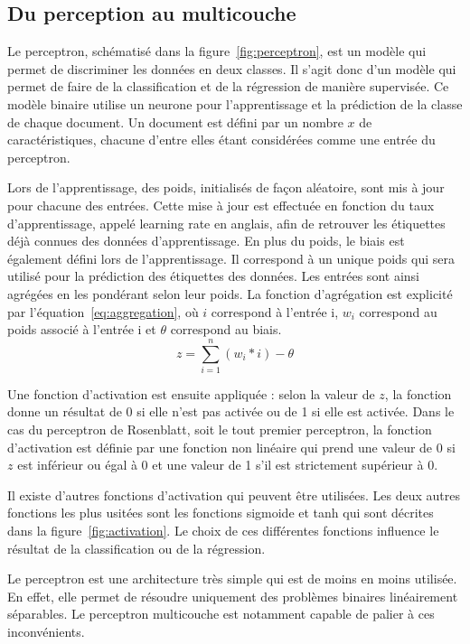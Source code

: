 \subsection{Du perception au multicouche}

Le perceptron, schématisé dans la figure~\ref{fig:perceptron}, est un modèle qui permet de discriminer les données en deux classes. Il s'agit donc d'un modèle qui permet de faire de la classification et de la régression de manière supervisée. Ce modèle binaire utilise un neurone pour l'apprentissage et la prédiction de la classe de chaque document. Un document est défini par un nombre $x$ de caractéristiques, chacune d'entre elles étant considérées comme une entrée du perceptron.

Lors de l'apprentissage, des poids, initialisés de façon aléatoire, sont mis à jour pour chacune des entrées. Cette mise à jour est effectuée en fonction du taux d'apprentissage, appelé learning rate en anglais, afin de retrouver les étiquettes déjà connues des données d'apprentissage. En plus du poids, le biais est également défini lors de l'apprentissage. Il correspond à un unique poids qui sera utilisé pour la prédiction des étiquettes des données. Les entrées sont ainsi agrégées en les pondérant selon leur poids. La fonction d'agrégation est explicité par l'équation~\ref{eq:aggregation}, où $i$ correspond à l'entrée i, $w_i$ correspond au poids associé à l'entrée i et $\theta$ correspond au biais.
\begin{equation}
  z = \sum_{i=1}^{n}(w_i*i) - \theta
  \label{eq:aggregation}
\end{equation}

Une fonction d'activation est ensuite appliquée : selon la valeur de $z$, la fonction donne un résultat de 0 si elle n'est pas activée ou de 1 si elle est activée. Dans le cas du perceptron de Rosenblatt, soit le tout premier perceptron, la fonction d'activation est définie par une fonction non linéaire qui prend une valeur de 0 si $z$ est inférieur ou égal à 0 et une valeur de 1 s'il est strictement supérieur à 0.


Il existe d'autres fonctions d'activation qui peuvent être utilisées. Les deux autres fonctions les plus usitées sont les fonctions sigmoide et tanh qui sont décrites dans la figure~\ref{fig:activation}. Le choix de ces différentes fonctions influence le résultat de la classification ou de la régression.

Le perceptron est une architecture très simple qui est de moins en moins utilisée. En effet, elle permet de résoudre uniquement des problèmes binaires linéairement séparables. Le perceptron multicouche est notamment capable de palier à ces inconvénients.

